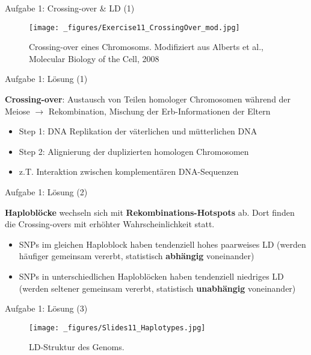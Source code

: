 \documentclass{beamer}
\begin{document}
\begin{frame}{Aufgabe 1: Crossing-over \& LD (1)}
\begin{figure}[h]
\begin{center}
\texttt{[image: \_figures/Exercise11\_CrossingOver\_mod.jpg]}
\caption{Crossing-over eines Chromosoms. Modifiziert aus Alberts et al., Molecular Biology of the Cell, 2008}
\label{fig:CrossingOver}
\end{center}
\end{figure}
\end{frame}

\begin{frame}{Aufgabe 1: Lösung (1)}

\textbf{Crossing-over}: Austausch von Teilen homologer Chromosomen während der Meiose $\longrightarrow$ Rekombination, Mischung der Erb-Informationen der Eltern

\begin{itemize}
    \item Step 1: DNA Replikation der väterlichen und mütterlichen DNA
    \item Step 2: Alignierung der duplizierten homologen Chromosomen
    \item z.T. Interaktion zwischen komplementären DNA-Sequenzen 
\end{itemize}
\end{frame}

\begin{frame}{Aufgabe 1: Lösung (2)}

\textbf{Haploblöcke} wechseln sich mit \textbf{Rekombinations-Hotspots} ab. Dort finden die Crossing-overs mit erhöhter Wahrscheinlichkeit statt. 

\begin{itemize}
    \item SNPs im gleichen Haploblock haben tendenziell hohes paarweises LD (werden häufiger gemeinsam vererbt, statistisch \textbf{abhängig} voneinander)
    \item SNPs in unterschiedlichen Haploblöcken haben tendenziell niedriges LD (werden seltener gemeinsam vererbt, statistisch \textbf{unabhängig} voneinander) 
\end{itemize}
\end{frame}


\begin{frame}{Aufgabe 1: Lösung (3)}
\begin{figure}[h]
\begin{center}
\texttt{[image: \_figures/Slides11\_Haplotypes.jpg]}
\caption{LD-Struktur des Genoms.}
\label{fig:Haploblock}
\end{center}
\end{figure}
\end{frame}
\end{document}
